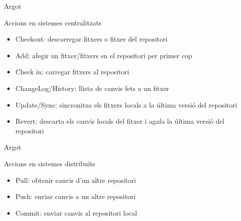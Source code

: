 \documentclass[10pt,xcolor={rgb}]{beamer}
\begin{document}
    \begin{frame}[fragile]{Argot}
      
            \begin{block}{Accions en sistemes centralitzats}
      
              \begin{itemize}
                \item Checkout:  descarregar fitxers o fitxer del repositori
                \item Add:  afegir un fitxer/fitxers en el repositori per primer cop
                \item Check in: carregar fitxers al repositori
                \item ChangeLog/History:  llista de canvis fets a un fitxer
                \item Update/Sync: sincronitza els fitxers locals a la última versió del repositori
                \item Revert: descarta els canvis locals del fitxer i agafa la última versió del repositori
              \end{itemize}
            \end{block}
      
    \end{frame}

    \begin{frame}[fragile]{Argot}
      
            \begin{block}{Accions en sistemes distribuïts}
      
              \begin{itemize}
                \item Pull:  obtenir canvis d'un altre repositori
                \item Push:  enviar canvis a un altre repositori
                \item Commit: enviar canvis al repositori local 
             \end{itemize}
            \end{block}
      
    \end{frame}
\end{document}
